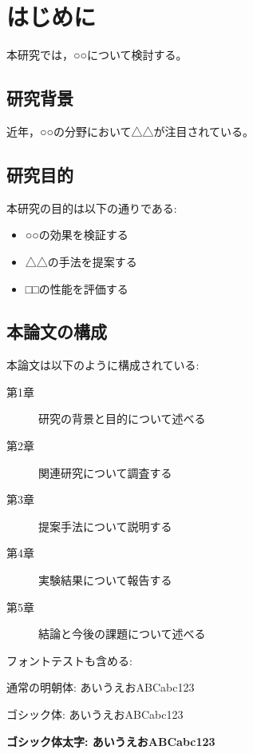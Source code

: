 \chapter{はじめに}

本研究では，○○について検討する。

\section{研究背景}

近年，○○の分野において△△が注目されている。

\section{研究目的}

本研究の目的は以下の通りである:

\begin{itemize}
    \item ○○の効果を検証する
    \item △△の手法を提案する
    \item □□の性能を評価する
\end{itemize}

\section{本論文の構成}

本論文は以下のように構成されている:

\begin{description}
    \item[第1章] 研究の背景と目的について述べる
    \item[第2章] 関連研究について調査する
    \item[第3章] 提案手法について説明する
    \item[第4章] 実験結果について報告する
    \item[第5章] 結論と今後の課題について述べる
\end{description}

フォントテストも含める:

通常の明朝体: あいうえおABCabc123

{\sffamily ゴシック体: あいうえおABCabc123}

{\sffamily\bfseries ゴシック体太字: あいうえおABCabc123}
